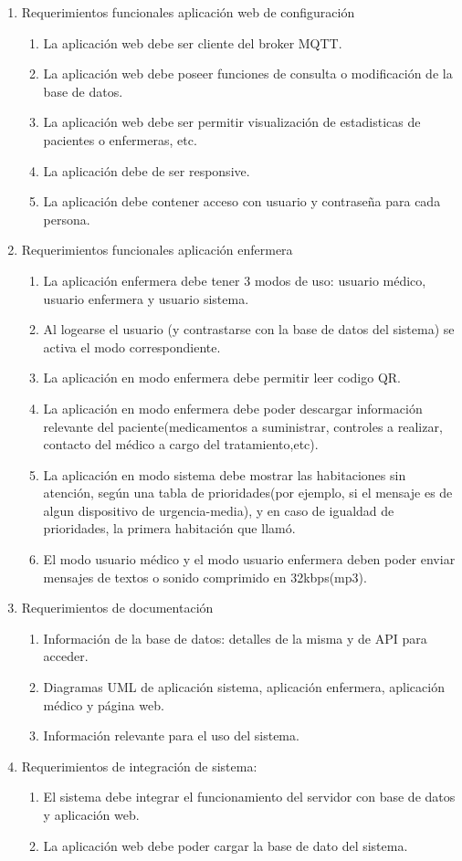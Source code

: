 \documentclass[
11pt, %
]{charter}
\begin{document}
\begin{enumerate}
\begin{enumerate}
		\end{enumerate}	
	\item Requerimientos funcionales aplicación web de configuración
		\begin{enumerate}	
		\item La aplicación web debe ser cliente del broker MQTT.
		\item La aplicación web debe poseer funciones de consulta o modificación de la base de datos.
		\item La aplicación web debe ser permitir visualización de estadisticas de pacientes o enfermeras, etc.
		\item La aplicación debe de ser responsive.
		\item La aplicación debe contener acceso con usuario y contraseña para cada persona.
		\end{enumerate}			
	\item Requerimientos funcionales aplicación enfermera
		\begin{enumerate}
			\item La aplicación enfermera debe tener 3 modos de uso: usuario médico, usuario enfermera y usuario sistema.
			\item Al logearse el usuario (y contrastarse con la base de datos del sistema) se activa el modo correspondiente.
			\item La aplicación en modo enfermera debe permitir leer codigo QR.			
			\item La aplicación en modo enfermera debe poder descargar información relevante del paciente(medicamentos a suministrar, controles a realizar, contacto del médico a cargo del tratamiento,etc).	
			\item La aplicación en modo sistema debe mostrar las habitaciones sin atención,  según una tabla de prioridades(por ejemplo, si el mensaje es de algun dispositivo de urgencia-media), y en caso de igualdad de prioridades, la primera habitación que llamó.
			\item El modo usuario médico y el modo usuario enfermera deben poder enviar mensajes de textos o sonido comprimido en 32kbps(mp3).
			
		\end{enumerate}
	\item Requerimientos de documentación
		\begin{enumerate}
			\item Información de la base de datos: detalles de la misma y de API para acceder.
			\item Diagramas UML de aplicación sistema, aplicación enfermera, aplicación médico y página web.
			\item Información relevante para el uso del sistema.
		\end{enumerate}
	\item Requerimientos de integración de sistema:	
			\begin{enumerate}
			\item El sistema debe integrar el funcionamiento del servidor con base de datos y aplicación web.
			\item La aplicación web debe poder cargar la base de dato del sistema.
			\end{enumerate}	
	


\end{enumerate}
\end{document}
